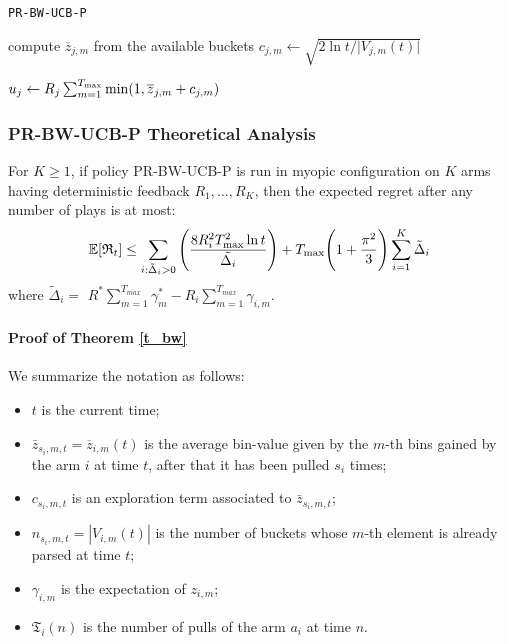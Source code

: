 \begin{algorithm}[H]
	\caption{\texttt{PR-BW-UCB-P}}
	\begin{scriptsize}
		\begin{algorithmic}[1]
			
			
			
			
			
			\State compute $\overline{z}_{j,m}$ from the available buckets \;
			\State$c_{j,m}\gets \sqrt{{2\ln t}/{\vert V_{j,m}(t) \vert}}$\;
			
			\EndFor		
			
			\State $u_j \gets R_j \sum_{m=1}^{T_{\textnormal{max}}} \min(1,\overline{z}_{j,m}+c_{j,m}) $\;	
			\EndFor
			
			
			
			
			\EndFunction
			
		\end{algorithmic}
	\end{scriptsize}
	\label{alg:Bound1}
\end{algorithm}
\subsubsection{PR-BW-UCB-P Theoretical Analysis}

\begin{theorem}
	For $K \ge 1$, if policy PR-BW-UCB-P is run in myopic configuration on $K$ arms having deterministic feedback $R_1,\dots,R_K$, then the expected regret after any number of plays is at most:
	\[ \mathbb{E}[\mathfrak{R}_t] \le \sum_{i:\tilde{\Delta}_i>0} \Bigg( \frac{8 R_i^2 T_{\textnormal{max}}^2\ln t }{\tilde{\Delta_i}} \Bigg) + T_{\textnormal{max}}\Bigg( 1 + \frac{\pi^2}{3} \Bigg)\sum_{i=1}^{K} \tilde{\Delta}_i\]
	where $\tilde{\Delta}_i =$  $R^*\sum_{m=1}^{T_{max}}\gamma^*_{m} - R_i \sum_{m=1}^{T_{max}} \gamma_{i,m}$.
	\label{t_bw}
\end{theorem} 



\paragraph{Proof of Theorem \ref{t_bw}}

We summarize the notation as follows: 

\begin{itemize}
	\item $t$ is the current time;
	\item $\bar{z}_{s_i,m,t} = \overline{z}_{i,m}(t)$  is the average bin-value given by the $m$-th bins gained by the arm $i$ at time $t$, after that it has been pulled $s_i$ times;
	\item $c_{s_i,m,t}$ is an exploration term associated to $\bar{z}_{s_i,m,t}$;
	\item $n_{s_i,m,t}=|V_{i,m}(t)|$ is the number of buckets whose $m$-th element is already parsed at time $t$;
	\item $\gamma_{i,m}$ is the expectation of $z_{i,m}$;
	\item $\mathfrak{T}_i(n)$  is the number of pulls of the arm $a_i$ at time $n$.
\end{itemize}

